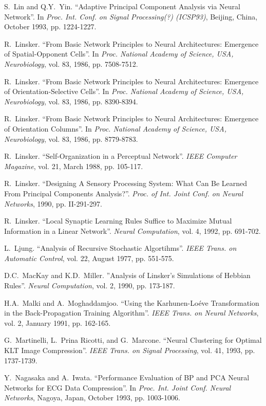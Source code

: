 \begin{thebibliography}{999}
S.~Lin and Q.Y.~Yin.
``Adaptive Principal Component Analysis via Neural Network''.
In {\em Proc. Int. Conf. on Signal Processing(?) (ICSP93)}, Beijing,
China, October 1993, pp. 1224-1227.

R.~Linsker.
``From Basic Network Principles to Neural Architectures: Emergence of
Spatial-Opponent Cells''.
In {\em Proc. National Academy of Science, USA, Neurobiology},
vol. 83, 1986, pp. 7508-7512.

R.~Linsker.
``From Basic Network Principles to Neural Architectures: Emergence of
Orientation-Selective Cells''.
In {\em Proc. National Academy of Science, USA, Neurobiology},
vol. 83, 1986, pp. 8390-8394.

R.~Linsker.
``From Basic Network Principles to Neural Architectures: Emergence of
Orientation Columns''.
In {\em Proc. National Academy of Science, USA, Neurobiology},
vol. 83, 1986, pp. 8779-8783.

R.~Linsker.
``Self-Organization in a Perceptual Network''.
{\em IEEE Computer Magazine}, vol. 21, March 1988, pp. 105-117.
 
R.~Linsker.
``Designing A Sensory Processing System:
What Can Be Learned From Principal Components Analysis?''.
{\em Proc. of Int. Joint Conf. on Neural Networks}, 1990, pp. II-291-297.

R.~Linsker.
``Local Synaptic Learning Rules Suffice to Maximize Mutual Information
in a Linear Network''.
{\em Neural Computation}, vol. 4, 1992, pp. 691-702.

L.~Ljung.
``Analysis of Recursive Stochastic Algortihms''.
{\em IEEE Trans. on Automatic Control}, vol. 22, August 1977, pp. 551-575.
 
D.C.~MacKay and K.D.~Miller.
''Analysis of Linsker's Simulations of Hebbian Rules''.
{\em Neural Computation}, vol. 2, 1990, pp. 173-187.

H.A.~Malki and A.~Moghaddamjoo.
``Using the Karhunen-Lo\'eve Transformation in the 
Back-Propagation Training Algorithm''.
{\em IEEE Trans. on Neural Networks}, vol. 2, January 1991, pp. 162-165.

G.~Martinelli, L.~Prina Ricotti, and G.~Marcone.
``Neural Clustering for Optimal KLT Image Compression''.
{\em IEEE Trans. on Signal Processing}, vol. 41, 1993, pp. 1737-1739.
 
Y.~Nagasaka and A.~Iwata.
``Performance Evaluation of BP and PCA Neural Networks for ECG Data
Compression''.
In {\em Proc. Int. Joint Conf. Neural Networks}, Nagoya, Japan,
October 1993, pp. 1003-1006.
 

\end{thebibliography}
